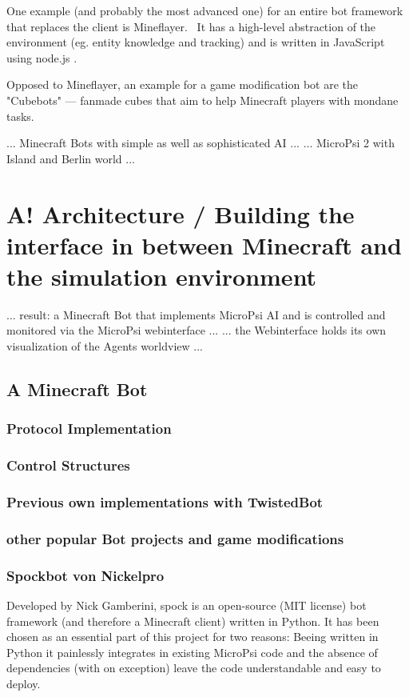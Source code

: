 One example (and probably the most advanced one) for an entire bot framework that replaces the client is Mineflayer.~\cite{github_mineflayer} It has a high-level abstraction of the environment (eg. entity knowledge and tracking) and is written in JavaScript using node.js .

Opposed to Mineflayer, an example for a game modification bot are the "Cubebots" --- fanmade cubes that aim to help Minecraft players with mondane tasks.\cite{mcforums_cubebots}


... Minecraft Bots with simple as well as sophisticated AI ...
... MicroPsi 2 with Island and Berlin world ...

\section{A! Architecture / Building the interface in between Minecraft and the simulation environment}
... result: a Minecraft Bot that implements MicroPsi AI and is controlled and monitored via the MicroPsi webinterface ...
... the Webinterface holds its own visualization of the Agents worldview ...

\subsection{A Minecraft Bot}

\subsubsection{Protocol Implementation}

\subsubsection{Control Structures}

\subsubsection{Previous own implementations with TwistedBot}

\subsubsection{other popular Bot projects and game modifications}

\subsubsection{Spockbot von Nickelpro}
Developed by Nick Gamberini, spock is an open-source (MIT license) bot framework (and therefore a Minecraft client) written in Python. It has been chosen as an essential part of this project for two reasons: Beeing written in Python it painlessly integrates in existing MicroPsi code and the absence of dependencies (with on exception) leave the code understandable and easy to deploy.

